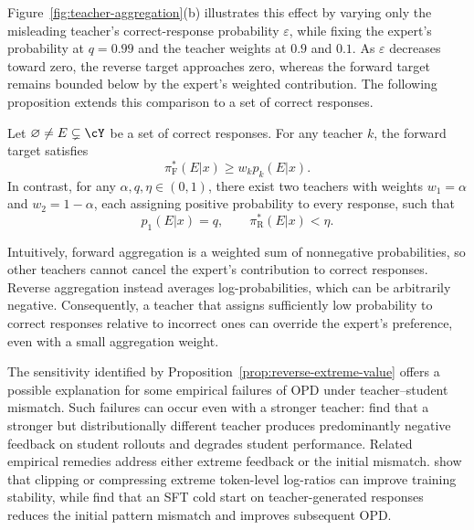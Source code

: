 \documentclass[11pt]{article}
\newcommand{\pif}{\pi_{\mathrm{F}}}
\newcommand{\pir}{\pi_{\mathrm{R}}}
\begin{document}
Figure~\ref{fig:teacher-aggregation}(b) illustrates this effect by varying only the misleading teacher's correct-response probability $\varepsilon$, while fixing the expert's probability at $q=0.99$ and the teacher weights at $0.9$ and $0.1$. As $\varepsilon$ decreases toward zero, the reverse target approaches zero, whereas the forward target remains bounded below by the expert's weighted contribution. The following proposition extends this comparison to a set of correct responses.
\begin{proposition}
\label{prop:reverse-extreme-value}
Let $\varnothing\neq E\subsetneq\cY$ be a set of correct responses. For any teacher $k$, the forward target satisfies
\[
    \pif^*(E|x)\geq w_kp_k(E|x).
\]
In contrast, for any $\alpha,q,\eta\in(0,1)$, there exist two teachers with weights $w_1=\alpha$ and $w_2=1-\alpha$, each assigning positive probability to every response, such that
\[
    p_1(E|x)=q,
    \qquad
    \pir^*(E|x)<\eta.
\]
\end{proposition}
Intuitively, forward aggregation is a weighted sum of nonnegative probabilities, so other teachers cannot cancel the expert's contribution to correct responses. Reverse aggregation instead averages log-probabilities, which can be arbitrarily negative. Consequently, a teacher that assigns sufficiently low probability to correct responses relative to incorrect ones can override the expert's preference, even with a small aggregation weight.

\begin{remark}
The sensitivity identified by Proposition~\ref{prop:reverse-extreme-value} offers a possible explanation for some empirical failures of OPD under teacher--student mismatch. Such failures can occur even with a stronger teacher: \citet{ma2026mopd} find that a stronger but distributionally different teacher produces predominantly negative feedback on student rollouts and degrades student performance. Related empirical remedies address either extreme feedback or the initial mismatch. \citet{wang2026demystifying} show that clipping or compressing extreme token-level log-ratios can improve training stability, while \citet{li2026rethinking} find that an SFT cold start on teacher-generated responses reduces the initial pattern mismatch and improves subsequent OPD.
\end{remark}
\end{document}
